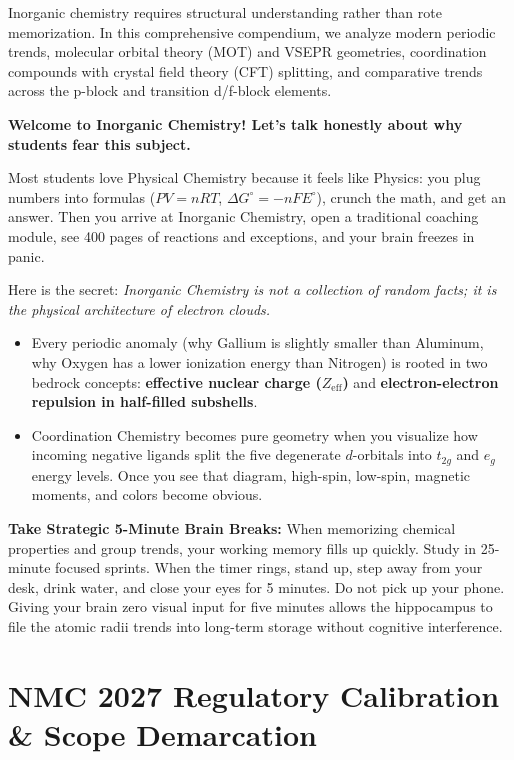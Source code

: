 \documentclass[10pt,twoside,openright]{book}
\begin{document}
Inorganic chemistry requires structural understanding rather than rote memorization. In this comprehensive compendium, we analyze modern periodic trends, molecular orbital theory (MOT) and VSEPR geometries, coordination compounds with crystal field theory (CFT) splitting, and comparative trends across the p-block and transition d/f-block elements.

\begin{mentorbox}
\textbf{Welcome to Inorganic Chemistry! Let's talk honestly about why students fear this subject.}

Most students love Physical Chemistry because it feels like Physics: you plug numbers into formulas ($PV = nRT$, $\Delta G^\circ = -nFE^\circ$), crunch the math, and get an answer. Then you arrive at Inorganic Chemistry, open a traditional coaching module, see 400 pages of reactions and exceptions, and your brain freezes in panic.

Here is the secret: \textit{Inorganic Chemistry is not a collection of random facts; it is the physical architecture of electron clouds.} 
\begin{itemize}[leftmargin=*]
  \item Every periodic anomaly (why Gallium is slightly smaller than Aluminum, why Oxygen has a lower ionization energy than Nitrogen) is rooted in two bedrock concepts: \textbf{effective nuclear charge ($Z_{\text{eff}}$)} and \textbf{electron-electron repulsion in half-filled subshells}.
  \item Coordination Chemistry becomes pure geometry when you visualize how incoming negative ligands split the five degenerate $d$-orbitals into $t_{2g}$ and $e_g$ energy levels. Once you see that diagram, high-spin, low-spin, magnetic moments, and colors become obvious.
\end{itemize}

\textbf{Take Strategic 5-Minute Brain Breaks:}
When memorizing chemical properties and group trends, your working memory fills up quickly. Study in 25-minute focused sprints. When the timer rings, stand up, step away from your desk, drink water, and close your eyes for 5 minutes. Do not pick up your phone. Giving your brain zero visual input for five minutes allows the hippocampus to file the atomic radii trends into long-term storage without cognitive interference.
\end{mentorbox}

\section{NMC 2027 Regulatory Calibration \& Scope Demarcation}
\end{document}
